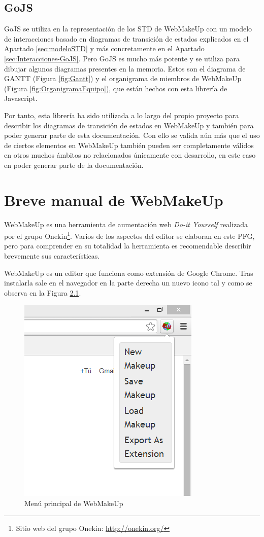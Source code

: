 \section{GoJS}
\label{sec:Gestion-GoJS}

GoJS se utiliza en la representación de los STD de WebMakeUp con un modelo de interacciones basado en diagramas de transición de estados explicados en el Apartado \ref{sec:modeloSTD} y más concretamente en el Apartado \ref{sec:Interacciones-GoJS}. Pero GoJS es mucho más potente y se utiliza para dibujar algunos diagramas presentes en la memoria.
Estos son el diagrama de GANTT (Figura \ref{fig:Gantt}) y el organigrama de miembros de WebMakeUp (Figura \ref{fig:OrganigramaEquipo}), que están hechos con esta librería de Javascript. 

Por tanto, esta librería ha sido utilizada a lo largo del propio proyecto para describir los diagramas de transición de estados en WebMakeUp y también para poder generar parte de esta documentación. Con ello se valida aún más que el uso de ciertos elementos en WebMakeUp también pueden ser completamente válidos en otros muchos ámbitos no relacionados únicamente con desarrollo, en este caso en poder generar parte de la documentación.


\chapter{Breve manual de WebMakeUp}
\label{sec:ManualWebMakeUp}

WebMakeUp es una herramienta de aumentación web \emph{Do-it Yourself} realizada por el grupo Onekin\footnote{Sitio web del grupo Onekin: \url{http://onekin.org/}}. Varios de los aspectos del editor se elaboran en este PFG, pero para comprender en su totalidad la herramienta es recomendable describir brevemente sus características.

WebMakeUp es un editor que funciona como extensión de Google Chrome. Tras instalarla sale en el navegador en la parte derecha un nuevo icono tal y como se observa en la Figura \ref{fig:MenuWebMakeUp}.

\begin{figure}
\centering
\includegraphics[width=0.45\linewidth]{./figs/A-MenuWebMakeUp}
\caption{Menú principal de WebMakeUp}
\label{fig:MenuWebMakeUp}
\end{figure}

